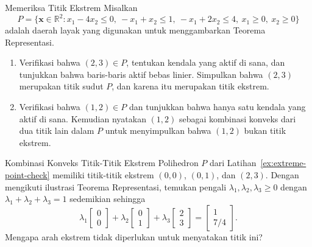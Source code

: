 \begin{ex}{Memeriksa Titik Ekstrem}{}
\label{ex:extreme-point-check}
Misalkan
\[
P = \{ \mathbf{x} \in \mathbb{R}^2 : x_1 - 4x_2 \leq 0,\ -x_1 + x_2 \leq 1,\ -x_1 + 2x_2 \leq 4,\ x_1 \geq 0,\ x_2 \geq 0 \}
\]
adalah daerah layak yang digunakan untuk menggambarkan Teorema Representasi.
\begin{enumerate}
    \item Verifikasi bahwa \( (2,3) \in P \), tentukan kendala yang aktif di sana, dan tunjukkan bahwa baris-baris aktif bebas linier. Simpulkan bahwa \( (2,3) \) merupakan titik sudut \( P \), dan karena itu merupakan titik ekstrem.
    \item Verifikasi bahwa \( (1,2) \in P \) dan tunjukkan bahwa hanya satu kendala yang aktif di sana. Kemudian nyatakan \( (1,2) \) sebagai kombinasi konveks dari dua titik lain dalam \( P \) untuk menyimpulkan bahwa \( (1,2) \) bukan titik ekstrem.
\end{enumerate}
\exrefs{\S\ref{sec:algebraic-vertex-proof}, \S\ref{sec:convexity}}
\end{ex}

\begin{ex}{Kombinasi Konveks Titik-Titik Ekstrem}{}
\label{ex:rep-theorem-combo}
Polihedron \( P \) dari Latihan~\ref{ex:extreme-point-check} memiliki titik-titik ekstrem \( (0,0) \), \( (0,1) \), dan \( (2,3) \). Dengan mengikuti ilustrasi Teorema Representasi, temukan pengali \( \lambda_1, \lambda_2, \lambda_3 \geq 0 \) dengan \( \lambda_1 + \lambda_2 + \lambda_3 = 1 \) sedemikian sehingga
\[
\lambda_1 \begin{bmatrix} 0 \\ 0 \end{bmatrix} + \lambda_2 \begin{bmatrix} 0 \\ 1 \end{bmatrix} + \lambda_3 \begin{bmatrix} 2 \\ 3 \end{bmatrix} = \begin{bmatrix} 1 \\ 7/4 \end{bmatrix}.
\]
Mengapa arah ekstrem tidak diperlukan untuk menyatakan titik ini?
\end{ex}


